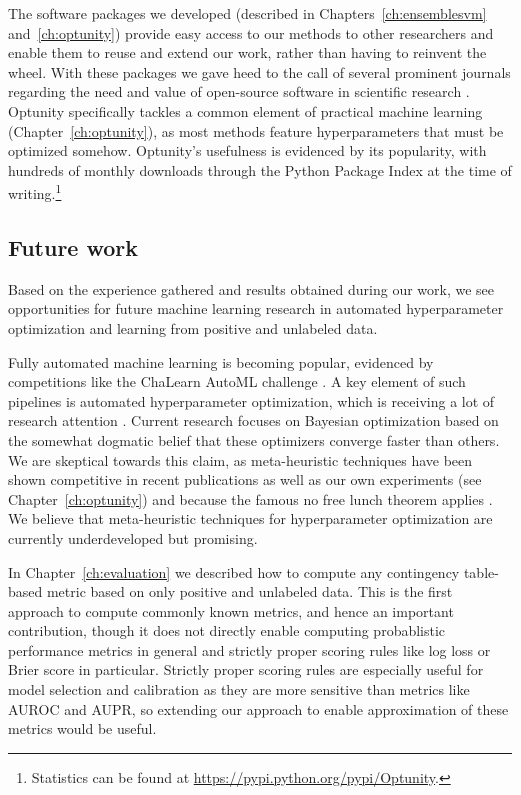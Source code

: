 The software packages we developed (described in Chapters~\ref{ch:ensemblesvm} and~\ref{ch:optunity}) provide easy access to our methods to other researchers and enable them to reuse and extend our work, rather than having to reinvent the wheel. With these packages we gave heed to the call of several prominent journals regarding the need and value of open-source software in scientific research \citep{sonnenburg2007need,prlic2012ten}. Optunity specifically tackles a common element of practical machine learning (Chapter~\ref{ch:optunity}), as most methods feature hyperparameters that must be optimized somehow. Optunity's usefulness is evidenced by its popularity, with hundreds of monthly downloads through the Python Package Index at the time of writing.\footnote{Statistics can be found at \url{https://pypi.python.org/pypi/Optunity}.}

\subsection{Future work} \label{conclusion:ml-future}
Based on the experience gathered and results obtained during our work, we see opportunities for future machine learning research in automated hyperparameter optimization and learning from positive and unlabeled data.

Fully automated machine learning is becoming popular, evidenced by competitions like the ChaLearn AutoML challenge \citep{guyondesign}. A key element of such pipelines is automated hyperparameter optimization, which is receiving a lot of research attention \citep{bergstra2011algorithms, snoek2012practical, bergstra2012random, bergstra2013making, eggensperger2013towards, martinez2014bayesopt, claesen2014easy, eggensperger2015efficient}. Current research focuses on Bayesian optimization based on the somewhat dogmatic belief that these optimizers converge faster than others. We are skeptical towards this claim, as meta-heuristic techniques have been shown competitive in recent publications \citep{papa2015model} as well as our own experiments (see Chapter~\ref{ch:optunity}) and because the famous no free lunch theorem  applies \citep{wolpert1997no}. We believe that meta-heuristic techniques for hyperparameter optimization are currently underdeveloped but promising.

In Chapter~\ref{ch:evaluation} we described how to compute any contingency table-based metric based on only positive and unlabeled data. This is the first approach to compute commonly known metrics, and hence an important contribution, though it does not directly enable computing probablistic performance metrics in general and strictly proper scoring rules like log loss or Brier score in particular. Strictly proper scoring rules \citep{gneiting2007strictly} are especially useful for model selection and calibration as they are more sensitive than metrics like AUROC and AUPR, so extending our approach to enable approximation of these metrics would be useful.


